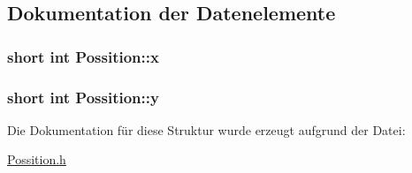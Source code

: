 \subsection{Dokumentation der Datenelemente}
\hypertarget{struct_possition_a07b558914470911fd3c10a745b0c7bc2}{}
\subsubsection[{x}]{\setlength{\rightskip}{0pt plus 5cm}short int Possition\+::x}\label{struct_possition_a07b558914470911fd3c10a745b0c7bc2}
\hypertarget{struct_possition_ad3af285b52a6199147abcd48ebf83624}{}
\subsubsection[{y}]{\setlength{\rightskip}{0pt plus 5cm}short int Possition\+::y}\label{struct_possition_ad3af285b52a6199147abcd48ebf83624}


Die Dokumentation für diese Struktur wurde erzeugt aufgrund der Datei\+:\begin{DoxyCompactItemize}
\item 
\hyperlink{_possition_8h}{Possition.\+h}\end{DoxyCompactItemize}

